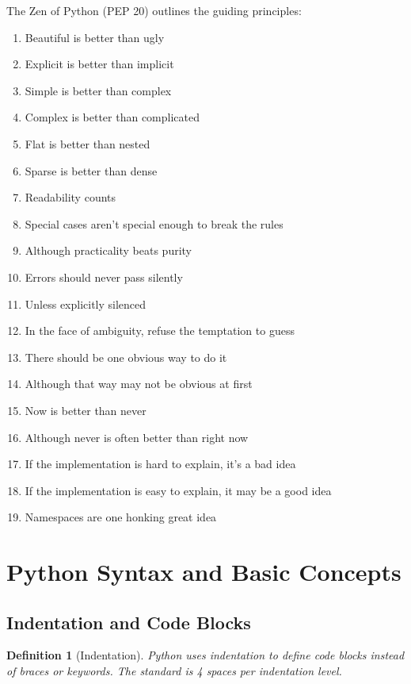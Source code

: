 \documentclass[11pt]{article}
\newtheorem{definition}{Definition}[section]
\begin{document}
The Zen of Python (PEP 20) outlines the guiding principles:
\begin{enumerate}
    \item Beautiful is better than ugly
    \item Explicit is better than implicit
    \item Simple is better than complex
    \item Complex is better than complicated
    \item Flat is better than nested
    \item Sparse is better than dense
    \item Readability counts
    \item Special cases aren't special enough to break the rules
    \item Although practicality beats purity
    \item Errors should never pass silently
    \item Unless explicitly silenced
    \item In the face of ambiguity, refuse the temptation to guess
    \item There should be one obvious way to do it
    \item Although that way may not be obvious at first
    \item Now is better than never
    \item Although never is often better than right now
    \item If the implementation is hard to explain, it's a bad idea
    \item If the implementation is easy to explain, it may be a good idea
    \item Namespaces are one honking great idea
\end{enumerate}

\section{Python Syntax and Basic Concepts}

\subsection{Indentation and Code Blocks}

\begin{definition}[Indentation]
Python uses indentation to define code blocks instead of braces or keywords. The standard is 4 spaces per indentation level.
\end{definition}
\end{document}
